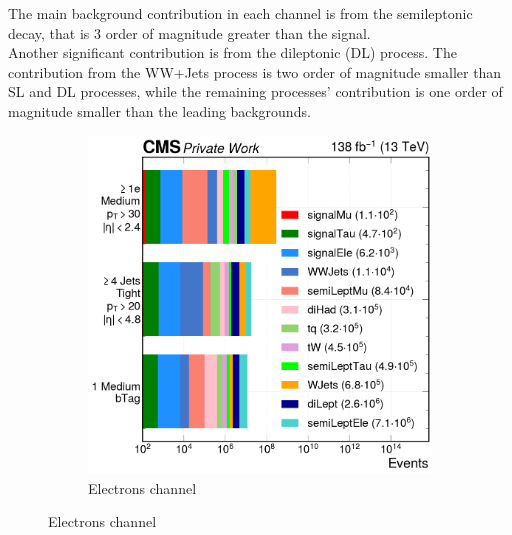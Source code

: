 The main background contribution in each channel is from the \ttbar semileptonic decay, that is 3 order of magnitude greater than the signal.\\
Another significant contribution is from the \ttbar dileptonic (DL) process. The contribution from the WW+Jets process is two order of magnitude smaller than \ttbar SL and \ttbar DL processes, while the remaining processes' contribution is one order of magnitude smaller than the leading backgrounds. 

\begin{figure}[H]
     \centering
     \begin{subfigure}{0.7\linewidth}
         \centering
         \includegraphics[width=\linewidth]{fig//chap07-selection/ele_selection.png}
         \caption{Electrons channel}

     \end{subfigure}
     

\end{figure}
